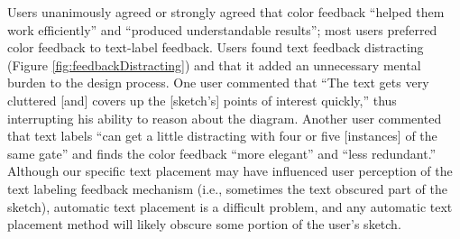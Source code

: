 \documentclass{egpubl}
\begin{document}



Users unanimously agreed or strongly agreed that color feedback
``helped them work efficiently'' and ``produced understandable
results''; most users preferred color feedback to text-label
feedback.  Users found text feedback distracting (Figure
\ref{fig:feedbackDistracting}) and that it added an unnecessary
mental burden to the design process.  One user commented that ``The
text gets very cluttered [and] covers up the [sketch's] points of
interest quickly,'' thus interrupting his ability to reason about the
diagram.  Another user commented that text labels ``can get a little
distracting with four or five [instances] of the same gate'' and finds
the color feedback ``more elegant'' and ``less redundant.''  Although our
specific text placement may have influenced user perception of the
text labeling feedback mechanism (i.e., sometimes the text obscured
part of the sketch), automatic text placement is a difficult problem,
and any automatic text placement method will likely obscure some
portion of the user's sketch.
\end{document}
